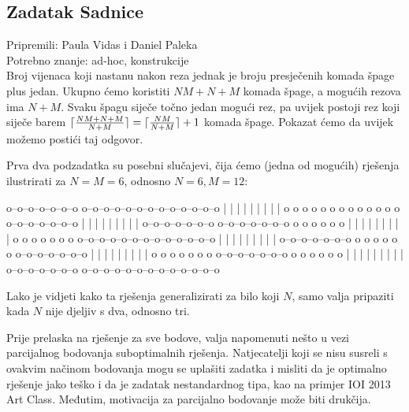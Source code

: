 \subsection*{Zadatak Sadnice}
\textsf{Pripremili: Paula Vidas i Daniel Paleka}\\
\textsf{Potrebno znanje: ad-hoc, konstrukcije}\\

Broj vijenaca koji nastanu nakon reza jednak je broju presječenih komada špage
plus jedan. Ukupno ćemo koristiti $NM + N + M$ komada špage, a mogućih rezova
ima $N + M$. Svaku špagu siječe točno jedan mogući rez, pa uvijek postoji rez
koji siječe barem $\lceil\frac{NM + N + M}{N + M}\rceil = \lceil\frac{NM}{N + M}\rceil +
1$ komada špage. Pokazat ćemo da uvijek možemo postići taj odgovor.

Prva dva podzadatka su posebni slučajevi, čija ćemo (jedna od mogućih) rješenja
ilustrirati za $N = M = 6$, odnosno $N = 6, M = 12$:

\begin{verbbox}
o--o--o--o--o--o--o              o--o--o--o--o--o--o--o--o--o--o--o--o
|  |  |           |              |  |  |  |        |
o  o  o  o  o  o  o              o  o  o  o  o  o  o--o--o--o--o--o--o
         |  |  |  |                          |  |  |  |  |
o--o--o--o--o--o--o              o--o--o--o--o--o--o  o  o  o  o  o  o
|  |  |           |                                |        |  |  |  |
o  o  o  o  o  o  o              o--o--o--o--o--o--o--o--o--o--o--o--o
         |  |  |  |              |  |  |  |        |
o--o--o--o--o--o--o              o  o  o  o  o  o  o--o--o--o--o--o--o
|  |  |           |                          |  |  |  |  |
o  o  o  o  o  o  o              o--o--o--o--o--o--o  o  o  o  o  o  o
         |  |  |  |                                |        |  |  |  |
o--o--o--o--o--o--o              o--o--o--o--o--o--o--o--o--o--o--o--o
\end{verbbox}
\begin{figure}[H]
  \centering
  \theverbbox
\end{figure}

Lako je vidjeti kako ta rješenja generalizirati za bilo koji $N$, 
samo valja pripaziti kada $N$ nije djeljiv s dva, odnosno tri. 

Prije prelaska na rješenje za sve bodove, valja napomenuti nešto u vezi
parcijalnog bodovanja suboptimalnih rješenja.
Natjecatelji koji se nisu susreli s ovakvim 
načinom bodovanja mogu se uplašiti zadatka i misliti da je optimalno
rješenje jako teško i da je zadatak nestandardnog tipa,
kao na primjer IOI 2013 Art Class.
Međutim, motivacija za parcijalno bodovanje može biti drukčija.

